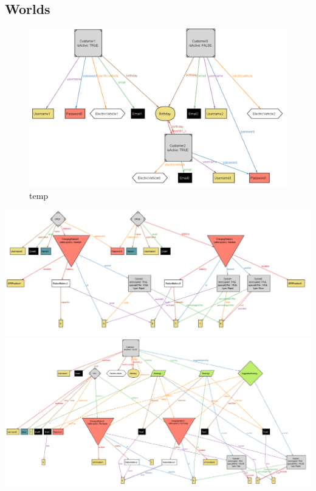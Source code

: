 \subsection{Worlds}
\begin{figure}[H]
	\hspace{-30pt}
	\includegraphics[width=1.2\textwidth]{img/world1.pdf}
	\caption{temp}
\end{figure}
\includegraphics[width=1.2\textwidth]{img/world2.pdf}
\includegraphics[width=1.2\textwidth]{img/world3.pdf}
